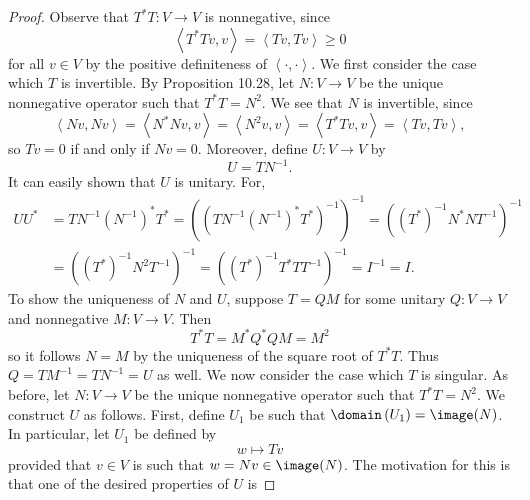 \documentclass[linearalgebra]{subfiles}
\begin{document}
    \begin{proof}
        Observe that $T^*T:V\to V$ is nonnegative, since
        \begin{equation*}
            \left\langle T^*Tv, v\right\rangle = \left\langle Tv, Tv\right\rangle \geq 0
        \end{equation*}
        for all $v\in V$ by the positive definiteness of $\left\langle \cdot, \cdot\right\rangle$. We first consider the case which $T$ is invertible. By Proposition 10.28, let $N:V\to V$ be the unique nonnegative operator such that $T^*T = N^2$. We see that $N$ is invertible, since
        \begin{equation*}
            \left\langle Nv, Nv\right\rangle = \left\langle N^*Nv, v\right\rangle = \left\langle N^2v, v\right\rangle = \left\langle T^*Tv, v\right\rangle = \left\langle Tv, Tv\right\rangle ,
        \end{equation*}
        so $Tv = 0$ if and only if $Nv = 0$. Moreover, define $U:V\to V$ by
        \begin{equation*}
            U = TN^{-1}.
        \end{equation*}
        It can easily shown that $U$ is unitary. For,
        \begin{align*}
            UU^* & = TN^{-1}\left( N^{-1} \right)^*T^* = \left( \left( TN^{-1}\left( N^{-1} \right) ^*T^* \right) ^{-1} \right) ^{-1} = \left( \left( T^* \right) ^{-1}N^*NT^{-1} \right) ^{-1} \\
                 & = \left( \left( T^* \right) ^{-1}N^2T^{-1} \right) ^{-1} = \left( \left( T^* \right)^{-1}T^*TT^{-1} \right) ^{-1} = I^{-1} = I.
        \end{align*} 
        To show the uniqueness of $N$ and $U$, suppose $T=QM$ for some unitary $Q:V\to V$ and nonnegative $M:V\to V$. Then
        \begin{equation*}
            T^*T = M^*Q^*QM = M^{2}
        \end{equation*}
        so it follows $N=M$ by the uniqueness of the square root of $T^*T$. Thus $Q=TM^{-1}=TN^{-1} = U$ as well. We now consider the case which $T$ is singular. As before, let $N:V\to V$ be the unique nonnegative operator such that $T^*T = N^2$. We construct $U$ as follows. First, define $U_1$ be such that $\domain\left( U_1 \right) = \image(N)$. In particular, let $U_1$ be defined by
        \begin{equation*}
            w\mapsto Tv
        \end{equation*}
        provided that $v\in V$ is such that $w=Nv\in\image(N)$. The motivation for this is that one of the desired properties of $U$ is 

\end{proof}
\end{document}
